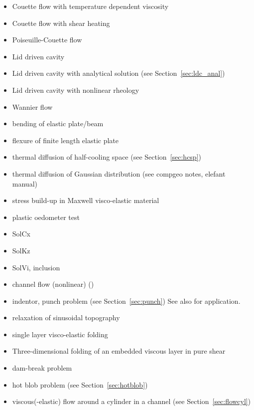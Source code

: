 \begin{itemize}
\item Couette flow with temperature dependent viscosity \cite{egat10,demh19}
\item Couette flow with shear heating \cite{egat10}
\item Poiseuille-Couette flow \cite{fusc13}
\item Lid driven cavity \cite{foth79,ghgs82,bope98,kawa61,brsa06,kost84,ertu09}
\item Lid driven cavity with analytical solution (see Section~\ref{sec:ldc_anal})
\item Lid driven cavity with nonlinear rheology \cite{been80}
\item Wannier flow \cite{wann50,yemu99,cehg14}
\item bending of elastic plate/beam \cite{cehg14,boht08a,vosc15,egat10,demh19,modm02,litu02}
\item flexure of finite length elastic plate \cite{chtl13}
\item thermal diffusion of half-cooling space (see Section~\ref{sec:hcsp}) 
\item thermal diffusion of Gaussian distribution (see compgeo notes, elefant manual)
\item stress build-up in Maxwell visco-elastic material \cite{geyu07,chtl13,egat10,demh19}
\item plastic oedometer test  \cite{chtl13}
\item SolCx \cite{mamo08,demh19,aspectmanual}
\item SolKz \cite{mamo08,demh19,aspectmanual}
\item SolVi, inclusion \cite{kapo06,maie12,deka08,bepo10,vosc15,demh19,aspectmanual,litu02}
\item channel flow (nonlinear) \cite{maie12,frbt19,gery10,egat10} (\bscthesis) 
\item indentor, punch problem (see Section~\ref{sec:punch})
      See also \cite{hukm03,fojd04,gerb12} for application.
\item relaxation of sinusoidal topography \cite{crsg12,robh17}
\item single layer visco-elastic folding \cite{vosc15}
\item Three-dimensional folding of an embedded viscous layer in pure shear \cite{flet91}
\item dam-break problem \cite{moeb99,bacp07,liir07,lemx08,homa09,anco09,grdn97,hini81,basd08}
\item hot blob problem \cite{bugs09,fumt11} (see Section~\ref{sec:hotblob})
\item viscous(-elastic) flow around a cylinder in a channel (see Section~\ref{sec:flowcyl})

\end{itemize}
